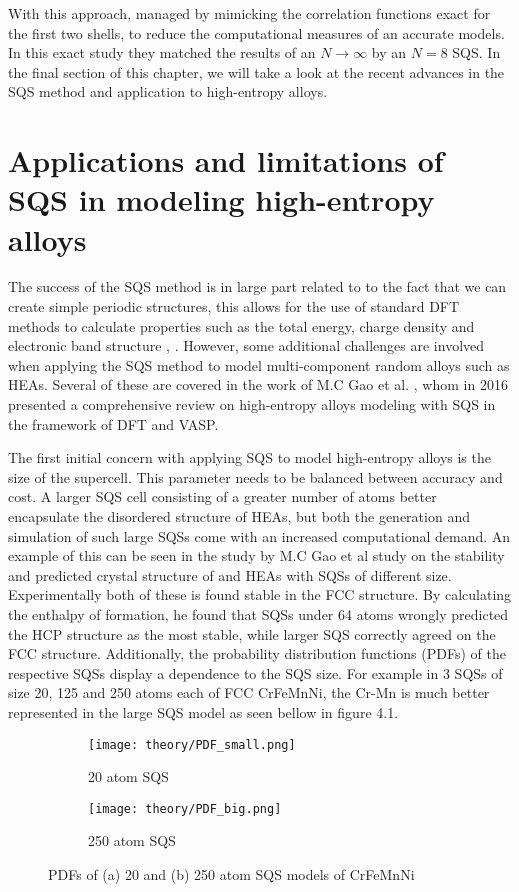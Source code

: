 With this approach, \cite{sqsfull} managed by mimicking the correlation functions exact for the first two shells, to reduce the computational measures of an accurate models. In this exact study they matched the results of an $N \rightarrow \infty$ by an $N=8$ SQS. In the final section of this chapter, we will take a look at the recent advances in the SQS method and application to high-entropy alloys. 

\section{Applications and limitations of SQS in modeling high-entropy alloys}
The success of the SQS method is in large part related to to the fact that we can create simple periodic structures, this allows for the use of standard DFT methods to calculate properties such as the total energy, charge density and electronic band structure \cite{sqs_dos}, \cite{sqs_bg}. However, some additional challenges are involved when applying the SQS method to model multi-component random alloys such as HEAs. Several of these are covered in the work of M.C Gao et al. \cite{hea2016_ch10}, whom in 2016 presented a comprehensive review on high-entropy alloys modeling with SQS in the framework of DFT and VASP.

The first initial concern with applying SQS to model high-entropy alloys is the size of the supercell. This parameter  needs to be balanced between accuracy and cost. A larger SQS cell consisting of a greater number of atoms better encapsulate the disordered structure of HEAs, but both the generation and simulation of such large SQSs come with an increased computational demand. An example of this can be seen in the study by M.C Gao et al study on the stability and predicted crystal structure of  and  HEAs with SQSs of different size. Experimentally both of these is found stable in the FCC structure. By calculating the enthalpy of formation, he found that SQSs under 64 atoms wrongly predicted the HCP structure as the most stable, while larger SQS correctly agreed on the FCC structure. Additionally, the probability distribution functions (PDFs) of the respective SQSs display a dependence to the SQS size. For example in 3 SQSs of size 20, 125 and 250 atoms each of FCC CrFeMnNi, the Cr-Mn is much better represented in the large SQS model as seen bellow in figure 4.1.

\begin{figure}[H]
\begin{subfigure}{.5\textwidth}
\texttt{[image: theory/PDF\_small.png]}
\caption{20 atom SQS}	
\end{subfigure}
\begin{subfigure}{.5\textwidth}
\texttt{[image: theory/PDF\_big.png]}
\caption{250 atom SQS}
\end{subfigure}
\caption{PDFs of (a) 20 and (b) 250 atom SQS models of CrFeMnNi \cite{hea2016_ch10}}
\end{figure}
     

